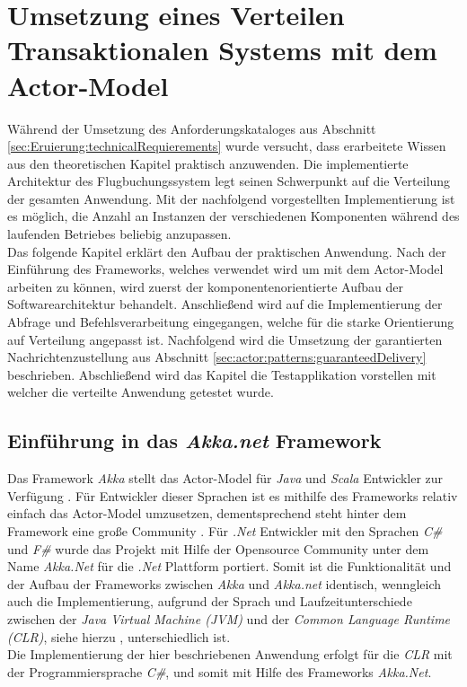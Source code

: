 \chapter{Umsetzung eines Verteilen Transaktionalen Systems mit dem  Actor-Model} 
\label{cha:practicalDevelopment}

Während der Umsetzung des Anforderungskataloges aus Abschnitt \ref{sec:Eruierung:technicalRequierements} wurde versucht, dass erarbeitete Wissen aus den theoretischen Kapitel praktisch anzuwenden. Die implementierte Architektur des Flugbuchungssystem legt seinen Schwerpunkt auf die Verteilung der gesamten Anwendung. Mit der nachfolgend vorgestellten Implementierung ist es möglich, die Anzahl an Instanzen der verschiedenen Komponenten während des laufenden Betriebes beliebig anzupassen. \\
Das folgende Kapitel erklärt den Aufbau der praktischen Anwendung. Nach der Einführung des Frameworks, welches verwendet wird um mit dem  Actor-Model arbeiten zu können, wird zuerst der komponentenorientierte Aufbau der Softwarearchitektur behandelt. Anschließend wird auf die Implementierung der Abfrage und Befehlsverarbeitung eingegangen, welche für die starke Orientierung auf Verteilung angepasst ist. Nachfolgend wird die Umsetzung der garantierten Nachrichtenzustellung aus Abschnitt \ref{sec:actor:patterns:guaranteedDelivery} beschrieben. Abschließend wird das Kapitel die Testapplikation vorstellen mit welcher die verteilte Anwendung getestet wurde.

\section{Einführung in das \textit{Akka.net} Framework}
\label{sec:implementation:akka}
Das Framework \textit{Akka} stellt das Actor-Model für \textit{Java} und \textit{Scala} Entwickler zur Verfügung \citep{gupta2012akkaEssentiaol}. Für Entwickler dieser Sprachen ist es mithilfe des Frameworks relativ einfach das Actor-Model umzusetzen, dementsprechend steht hinter dem Framework eine große Community \citep{Vernon2015ReactiveAkka}. Für \textit{.Net} Entwickler mit den Sprachen \textit{C\#} und \textit{F\#} wurde das Projekt mit Hilfe der Opensource Community unter dem Name \textit{Akka.Net} für die \textit{.Net} Plattform portiert. Somit ist die Funktionalität und der Aufbau der Frameworks zwischen \textit{Akka} und \textit{Akka.net} identisch, wenngleich auch die Implementierung, aufgrund der Sprach und Laufzeitunterschiede zwischen der \textit{Java Virtual Machine (JVM)} und der \textit{Common Language Runtime (CLR)}, siehe hierzu \cite{JvmVsClrsinger2003jvm}, unterschiedlich ist. \\
Die Implementierung der hier beschriebenen Anwendung erfolgt für die \textit{CLR} mit der Programmiersprache \textit{C\#}, und somit mit Hilfe des Frameworks \textit{Akka.Net}. 

